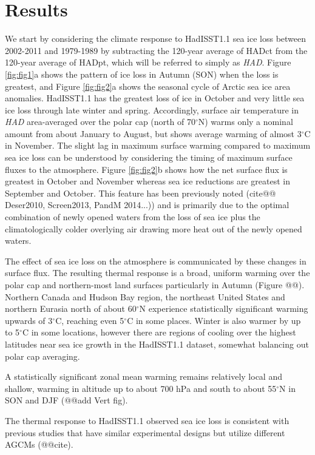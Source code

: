 \documentclass[twocol]{ametsoc}
\begin{document}
\section{Results}

We start by considering the climate response to HadISST1.1 sea ice loss between 2002-2011 and 1979-1989 by subtracting the 120-year average of HADct from the 120-year average of HADpt, which will be referred to simply as \textit{HAD}. Figure \ref{fig:fig1}a shows the pattern of ice loss in Autumn (SON) when the loss is greatest, and Figure \ref{fig:fig2}a shows the seasonal cycle of Arctic sea ice area anomalies. HadISST1.1 has the greatest loss of ice in October and very little sea ice loss through late winter and spring. Accordingly, surface air temperature in \textit{HAD} area-averaged over the polar cap (north of 70$^\circ$N) warms only a nominal amount from about January to August, but shows average warming of almost 3$^\circ$C in November. The slight lag in maximum surface warming compared to maximum sea ice loss can be understood by considering the timing of maximum surface fluxes to the atmosphere. Figure \ref{fig:fig2}b shows how the net surface flux is greatest in October and November whereas sea ice reductions are greatest in September and October. This feature has been previously noted (cite@@ Deser2010, Screen2013, PandM 2014...)) and is primarily due to the optimal combination of newly opened waters from the loss of sea ice plus the climatologically colder overlying air drawing more heat out of the newly opened waters. 

The effect of sea ice loss on the atmosphere is communicated by these changes in surface flux. The resulting thermal response is a broad, uniform warming over the polar cap and northern-most land surfaces particularly in Autumn (Figure @@). Northern Canada and Hudson Bay region, the northeast United States and northern Eurasia north of about 60$^\circ$N experience statistically significant warming upwards of 3$^\circ$C, reaching even 5$^\circ$C in some places. Winter is also warmer by up to 5$^\circ$C in some locations, however there are regions of cooling over the highest latitudes near sea ice growth in the HadISST1.1 dataset, somewhat balancing out polar cap averaging.

 A statistically significant zonal mean warming remains relatively local and shallow, warming in altitude up to about 700 hPa and south to about 55$^\circ$N in SON and DJF (@@add Vert fig).

The thermal response to HadISST1.1 observed sea ice loss is consistent with previous studies that have similar experimental designs but utilize different AGCMs (@@cite).
\end{document}
